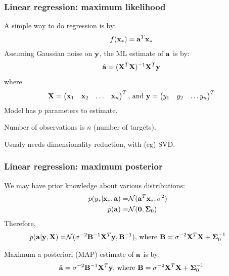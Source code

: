 \begin{frame}
\frametitle{Linear regression: maximum likelihood}
A simple way to do regression is by:
\begin{align*}
f({\bf x}_*) = {\bf a}^T {\bf x}_*
\end{align*}
Assuming Gaussian noise on ${\bf y}$, the ML estimate of ${\bf a}$ is by:
\begin{align*}
\hat{\bf a} = ({\bf X}^T{\bf X})^{-1}{\bf X}^T {\bf y}
\end{align*}
where
\begin{align*}
{\bf X} = \begin{pmatrix}{\bf x}_1 & {\bf x}_2 & \hdots & {\bf x}_n\end{pmatrix}^T \text{, and }
{\bf y} = \begin{pmatrix}y_1 & y_2 & \hdots y_n\end{pmatrix}^T
\end{align*}
Model has $p$ parameters to estimate.\par
Number of observations is $n$ (number of targets).\par
Usualy needs dimensionality reduction, with (eg) SVD.
\end{frame}

\begin{frame}
\frametitle{Linear regression: maximum posterior}
We may have prior knowledge about various distributions:
\begin{align*}
p(y_* | {\bf x}_*, {\bf a}) = & \mathcal{N}({\bf a}^T{\bf x}_*, \sigma^2)\cr
p({\bf a}) = & \mathcal{N}({\bf 0},\boldsymbol\Sigma_0)\cr
\end{align*}
Therefore,
\begin{align*}
p({\bf a}|{\bf y},{\bf X})  = & \mathcal{N}(\sigma^{-2}{\bf B}^{-1}{\bf X}^T{\bf y},{\bf B}^{-1}) \text{, where } {\bf B} = \sigma^{-2}{\bf X}^T{\bf X} + \boldsymbol\Sigma_0^{-1}
\end{align*}

Maximum a posteriori (MAP) estimate of ${\bf a}$ is by:
\begin{align*}
\hat{\bf a} = \sigma^{-2}{\bf B}^{-1}{\bf X}^T{\bf y} \text{, where } {\bf B} = \sigma^{-2}{\bf X}^T{\bf X} + \boldsymbol\Sigma_0^{-1}
\end{align*}
\end{frame}

